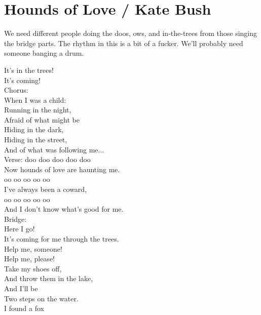 \section{Hounds of Love / Kate Bush}\label{sec:hounds_of_love}
  {\small We need different people doing the doos, ows, and in-the-trees from those singing the bridge parts. The rhythm in this is a bit of a fucker. We'll probably need someone banging a drum.}
  
  \Fmajor
  \Cmajor
  \BflatMajor
  \Aminor
  
  It's in the trees!\\
  It's coming!\\
  Chorus:\\
  When I was a child:\\
  Running in the night,\\
  Afraid of what might be\\
  Hiding in the dark,\\
  Hiding in the street,\\
  And of what was following me...\\
  Verse:
  doo doo doo doo doo\\
  Now hounds of love are haunting me. \\
  oo oo oo oo oo \\
  I've always been a coward,\\
  oo oo oo oo oo \\
  And I don't know what's good for me.\\
  Bridge:\\
  Here I go!\\
  It's coming for me through the trees.\\
  Help me, someone!\\
  Help me, please!\\
  Take my shoes off,\\
  And throw them in the lake,\\
  And I'll be\\
  Two steps on the water.\\
  I found a fox\\

